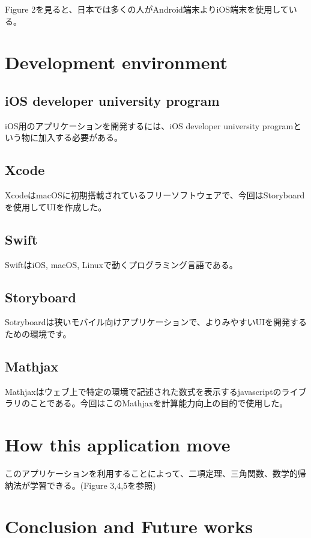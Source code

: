 \documentclass[ams]{U-AizuGT}
\begin{document}
      Figure 2を見ると、日本では多くの人がAndroid端末よりiOS端末を使用している。

	\section{Development environment}
		\subsection{iOS developer university program}
iOS用のアプリケーションを開発するには、iOS developer university programという物に加入する必要がある。

\subsection{Xcode}

XcodeはmacOSに初期搭載されているフリーソフトウェアで、今回はStoryboardを使用してUIを作成した。

\subsection{Swift}

SwiftはiOS, macOS, Linuxで動くプログラミング言語である。

\subsection{Storyboard}

Sotryboardは狭いモバイル向けアプリケーションで、よりみやすいUIを開発するための環境です。

\subsection{Mathjax}

Mathjaxはウェブ上で特定の環境で記述された数式を表示するjavascriptのライブラリのことである。今回はこのMathjaxを計算能力向上の目的で使用した。

	\section{How this application move}

このアプリケーションを利用することによって、二項定理、三角関数、数学的帰納法が学習できる。(Figure 3,4,5を参照)

\section{Conclusion and Future works}
\end{document}
